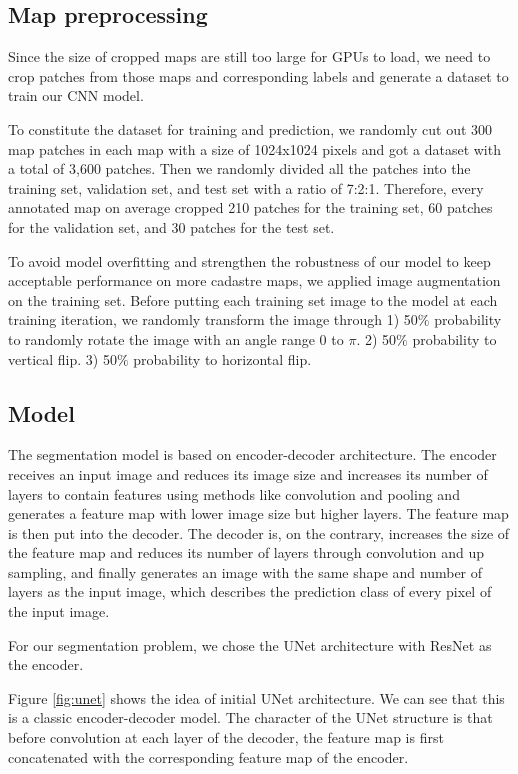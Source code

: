 \documentclass[12pt]{article}
\begin{document}
\subsection{Map preprocessing}
Since the size of cropped maps are still too large for GPUs to load, we need to crop patches from those maps and corresponding labels and generate a dataset to train our CNN model.

To constitute the dataset for training and prediction, we randomly cut out 300 map patches in each map with a size of 1024x1024 pixels and got a dataset with a total of 3,600 patches. Then we randomly divided all the patches into the training set, validation set, and test set with a ratio of 7:2:1. Therefore, every annotated map on average cropped 210 patches for the training set, 60 patches for the validation set, and 30 patches for the test set.

To avoid model overfitting and strengthen the robustness of our model to keep acceptable performance on more cadastre maps, we applied image augmentation on the training set. Before putting each training set image to the model at each training iteration, we randomly transform the image through 1) 50$\%$ probability to randomly rotate the image with an angle range 0 to $\pi$. 2) 50$\%$ probability to vertical flip. 3) 50$\%$ probability to horizontal flip.



\subsection{Model}
The segmentation model is based on encoder-decoder architecture. The encoder receives an input image and reduces its image size and increases its number of layers to contain features using methods like convolution and pooling and generates a feature map with lower image size but higher layers. The feature map is then put into the decoder. The decoder is, on the contrary, increases the size of the feature map and reduces its number of layers through convolution and up sampling, and finally generates an image with the same shape and number of layers as the input image, which describes the prediction class of every pixel of the input image. 

For our segmentation problem, we chose the UNet\cite{ronneberger2015u} architecture with  ResNet\cite{he2016deep} as the encoder.

Figure \ref{fig:unet} shows the idea of initial UNet architecture. We can see that this is a classic encoder-decoder model. The character of the UNet structure is that before convolution at each layer of the decoder, the feature map is first concatenated with the corresponding feature map of the encoder.
\end{document}
